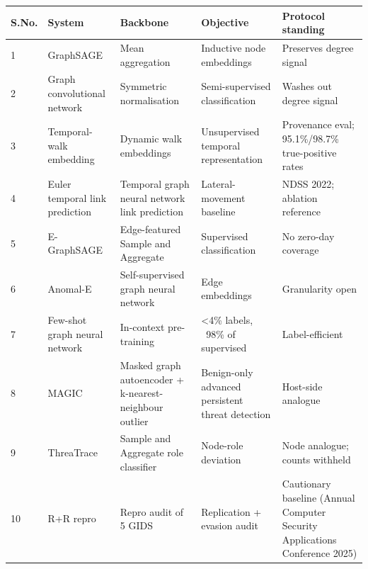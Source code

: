 \begin{center}
\begin{tabular}{lllll}
\toprule

S.No. & System & Backbone & Objective & Protocol standing \\

\midrule

1 & GraphSAGE \cite{k14} & Mean aggregation & Inductive node embeddings & Preserves degree signal \\

2 & Graph convolutional network \cite{k15} & Symmetric normalisation & Semi-supervised classification & Washes out degree signal \\

3 & Temporal-walk embedding \cite{k16} & Dynamic walk embeddings & Unsupervised temporal representation & Provenance eval; 95.1\%/98.7\% true-positive rates \\

4 & Euler temporal link prediction \cite{k17} & Temporal graph neural network link prediction & Lateral-movement baseline & NDSS 2022; ablation reference \\

5 & E-GraphSAGE \cite{k18} & Edge-featured Sample and Aggregate & Supervised classification & No zero-day coverage \\

6 & Anomal-E \cite{k19} & Self-supervised graph neural network & Edge embeddings & Granularity open \\

7 & Few-shot graph neural network \cite{k20} & In-context pre-training & <4\% labels, ~98\% of supervised & Label-efficient \\

8 & MAGIC \cite{k21} & Masked graph autoencoder + k-nearest-neighbour outlier & Benign-only advanced persistent threat detection & Host-side analogue \\

9 & ThreaTrace \cite{k22} & Sample and Aggregate role classifier & Node-role deviation & Node analogue; counts withheld \\

10 & R+R repro \cite{k23} & Repro audit of 5 GIDS & Replication + evasion audit & Cautionary baseline (Annual Computer Security Applications Conference 2025) \\

\bottomrule
\end{tabular}
\end{center}

